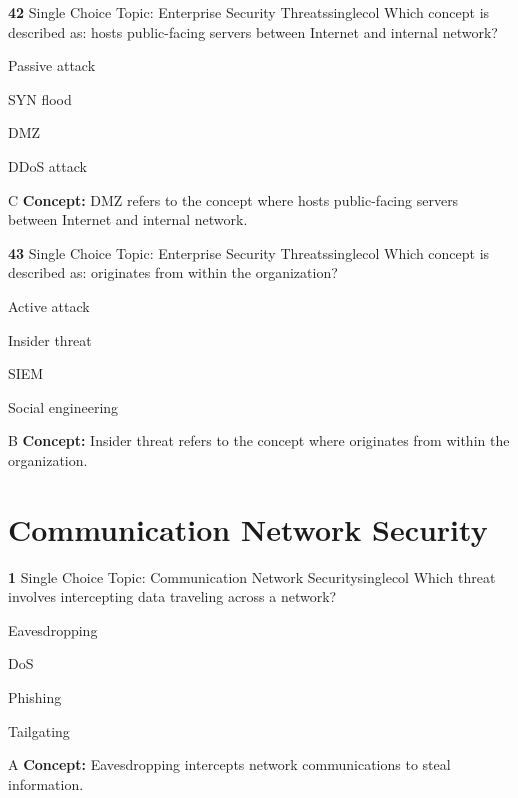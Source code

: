 \documentclass[10pt,a4paper]{article}
\begin{document}
\begin{qcard}{\color{white}\textbf{42} \hfill \small Single Choice \textbar{} Topic: Enterprise Security Threats}{singlecol}
Which concept is described as: hosts public-facing servers between Internet and internal network?

\begin{qoptions}
\item Passive attack
\item SYN flood
\item DMZ
\item DDoS attack
\end{qoptions}
\begin{explainbox}{C}
\textbf{Concept:} DMZ refers to the concept where hosts public-facing servers between Internet and internal network.
\end{explainbox}
\end{qcard}

\begin{qcard}{\color{white}\textbf{43} \hfill \small Single Choice \textbar{} Topic: Enterprise Security Threats}{singlecol}
Which concept is described as: originates from within the organization?

\begin{qoptions}
\item Active attack
\item Insider threat
\item SIEM
\item Social engineering
\end{qoptions}
\begin{explainbox}{B}
\textbf{Concept:} Insider threat refers to the concept where originates from within the organization.
\end{explainbox}
\end{qcard}

\section{Communication Network Security}
\begin{qcard}{\color{white}\textbf{1} \hfill \small Single Choice \textbar{} Topic: Communication Network Security}{singlecol}
Which threat involves intercepting data traveling across a network?

\begin{qoptions}
\item Eavesdropping
\item DoS
\item Phishing
\item Tailgating
\end{qoptions}
\begin{explainbox}{A}
\textbf{Concept:} Eavesdropping intercepts network communications to steal information.
\end{explainbox}
\end{qcard}
\end{document}
